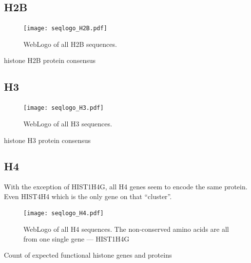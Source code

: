 \documentclass[10pt,a4paper,draft,article]{memoir}
\begin{document}
    \subsection{H2B}
      \begin{figure}
        \centering
        \texttt{[image: seqlogo\_H2B.pdf]}
        \caption{WebLogo of all H2B sequences.}
        \label{fig:h2b-weblogo}
      \end{figure}
      \begin{table}
        \centering
        
        \caption{histone H2B protein consensus}
        \label{tab:H2B-consensus}
      \end{table}

    \subsection{H3}
      \begin{figure}
        \centering
        \texttt{[image: seqlogo\_H3.pdf]}
        \caption{WebLogo of all H3 sequences.}
        \label{fig:h3-weblogo}
      \end{figure}
      \begin{table}
        \centering
        
        \caption{histone H3 protein consensus}
        \label{tab:H3-consensus}
      \end{table}

    \subsection{H4}
      With the exception of HIST1H4G, all H4 genes seem to encode the same protein. Even HIST4H4 which is the
      only gene on that ``cluster''.
      \begin{figure}
        \centering
        \texttt{[image: seqlogo\_H4.pdf]}
        \caption{WebLogo of all H4 sequences. The non-conserved amino acids are all from one single gene --- HIST1H4G}
        \label{fig:h4-weblogo}
      \end{figure}

      \begin{table}
        \centering
        
        \caption{Count of expected functional histone genes and proteins}
        \label{tab:H4-consensus}
      \end{table}
\end{document}
